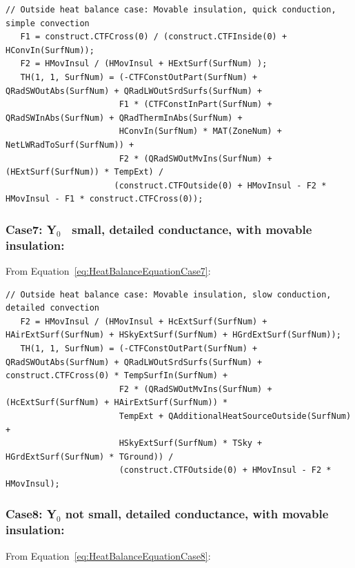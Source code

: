 \begin{lstlisting}
// Outside heat balance case: Movable insulation, quick conduction, simple convection
   F1 = construct.CTFCross(0) / (construct.CTFInside(0) + HConvIn(SurfNum));
   F2 = HMovInsul / (HMovInsul + HExtSurf(SurfNum) );
   TH(1, 1, SurfNum) = (-CTFConstOutPart(SurfNum) + QRadSWOutAbs(SurfNum) + QRadLWOutSrdSurfs(SurfNum) +
                       F1 * (CTFConstInPart(SurfNum) + QRadSWInAbs(SurfNum) + QRadThermInAbs(SurfNum) + 
                       HConvIn(SurfNum) * MAT(ZoneNum) + NetLWRadToSurf(SurfNum)) +
                       F2 * (QRadSWOutMvIns(SurfNum) + (HExtSurf(SurfNum)) * TempExt) /
                      (construct.CTFOutside(0) + HMovInsul - F2 * HMovInsul - F1 * construct.CTFCross(0));
\end{lstlisting}

\subsubsection{Case7: Y\(_{0}\)~ small, detailed conductance, with movable insulation:}\label{case7-yux5f0-small-detailed-conductance-with-movable-insulation-1}

From Equation~\ref{eq:HeatBalanceEquationCase7}:

\begin{lstlisting}
// Outside heat balance case: Movable insulation, slow conduction, detailed convection
   F2 = HMovInsul / (HMovInsul + HcExtSurf(SurfNum) + HAirExtSurf(SurfNum) + HSkyExtSurf(SurfNum) + HGrdExtSurf(SurfNum));
   TH(1, 1, SurfNum) = (-CTFConstOutPart(SurfNum) + QRadSWOutAbs(SurfNum) + QRadLWOutSrdSurfs(SurfNum) + construct.CTFCross(0) * TempSurfIn(SurfNum) +
                       F2 * (QRadSWOutMvIns(SurfNum) + (HcExtSurf(SurfNum) + HAirExtSurf(SurfNum)) * 
                       TempExt + QAdditionalHeatSourceOutside(SurfNum) +
                       HSkyExtSurf(SurfNum) * TSky + HGrdExtSurf(SurfNum) * TGround)) /
                       (construct.CTFOutside(0) + HMovInsul - F2 * HMovInsul);
\end{lstlisting}

\subsubsection{Case8: Y\(_{0}\) not small, detailed conductance, with movable insulation:}\label{case8-yux5f0-not-small-detailed-conductance-with-movable-insulation-1}

From Equation~\ref{eq:HeatBalanceEquationCase8}:

